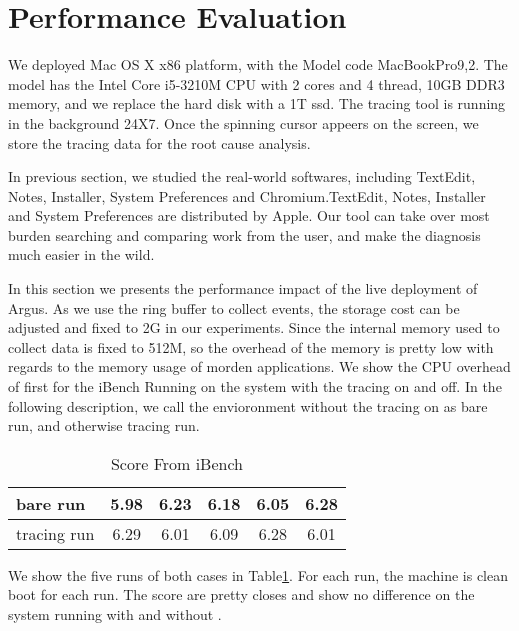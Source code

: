 \section{Performance Evaluation}
We deployed \xxx Mac OS X x86 platform, with the Model code MacBookPro9,2.  The
model has the Intel Core i5-3210M CPU with 2 cores and 4 thread, 10GB DDR3
memory, and we replace the hard disk with a 1T ssd.  The tracing tool is
running in the background 24X7.  Once the spinning cursor appeers on the
screen, we store the tracing data for the root cause analysis.

In previous section, we studied the real-world softwares, including TextEdit,
Notes, Installer, System Preferences and Chromium.TextEdit, Notes, Installer and System
Preferences are distributed by Apple.  
Our tool can take over most burden searching and comparing work from the user,
and make the diagnosis much easier in the wild.

In this section we presents the performance impact of the live deployment of Argus.
As we use the ring buffer to collect events, the storage cost can be adjusted
and fixed to 2G in our experiments.
Since the internal memory used to collect data is fixed to 512M, so the overhead of the
memory is pretty low with regards to the memory usage of  morden applications.
We show the CPU overhead of \xxx first for the iBench Running on the system with the tracing
on and off. In the following description, we call the envioronment without the tracing on as
bare run, and otherwise tracing run.

\begin{table}[h]
\begin{tabular}{|l|c|c|c|c|c|}
\hline
 bare run & 5.98 & 6.23 & 6.18 & 6.05 & 6.28\\
\hline
 tracing run& 6.29 & 6.01 & 6.09 & 6.28 & 6.01\\
\hline
\end{tabular}
\caption{Score From iBench}
\label{tab:ibench}
\end{table}
We show the five runs of both cases in Table\ref{tab:ibench}.
For each run, the machine is clean boot for each run.
The score are pretty closes and show no difference on the system running with and without \xxx.

